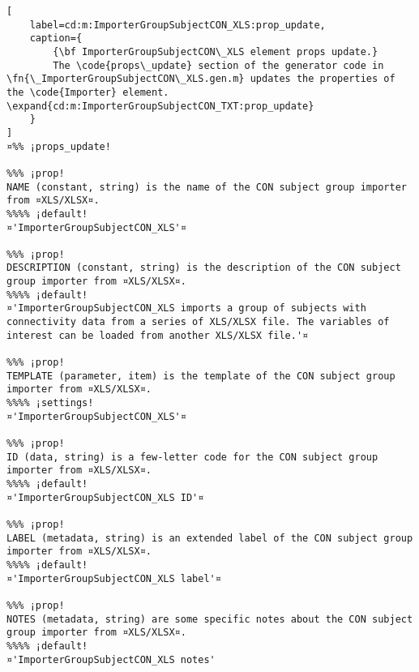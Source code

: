 \documentclass{tufte-handout}
\begin{document}
\begin{lstlisting}[
	label=cd:m:ImporterGroupSubjectCON_XLS:prop_update,
	caption={
		{\bf ImporterGroupSubjectCON\_XLS element props update.}
		The \code{props\_update} section of the generator code in \fn{\_ImporterGroupSubjectCON\_XLS.gen.m} updates the properties of the \code{Importer} element. \expand{cd:m:ImporterGroupSubjectCON_TXT:prop_update}
	}
]
¤%% ¡props_update!

%%% ¡prop!
NAME (constant, string) is the name of the CON subject group importer from ¤XLS/XLSX¤.
%%%% ¡default!
¤'ImporterGroupSubjectCON_XLS'¤

%%% ¡prop!
DESCRIPTION (constant, string) is the description of the CON subject group importer from ¤XLS/XLSX¤.
%%%% ¡default!
¤'ImporterGroupSubjectCON_XLS imports a group of subjects with connectivity data from a series of XLS/XLSX file. The variables of interest can be loaded from another XLS/XLSX file.'¤

%%% ¡prop!
TEMPLATE (parameter, item) is the template of the CON subject group importer from ¤XLS/XLSX¤.
%%%% ¡settings!
¤'ImporterGroupSubjectCON_XLS'¤

%%% ¡prop!
ID (data, string) is a few-letter code for the CON subject group importer from ¤XLS/XLSX¤.
%%%% ¡default!
¤'ImporterGroupSubjectCON_XLS ID'¤

%%% ¡prop!
LABEL (metadata, string) is an extended label of the CON subject group importer from ¤XLS/XLSX¤.
%%%% ¡default!
¤'ImporterGroupSubjectCON_XLS label'¤

%%% ¡prop!
NOTES (metadata, string) are some specific notes about the CON subject group importer from ¤XLS/XLSX¤.
%%%% ¡default!
¤'ImporterGroupSubjectCON_XLS notes'
\end{lstlisting}
\end{document}
